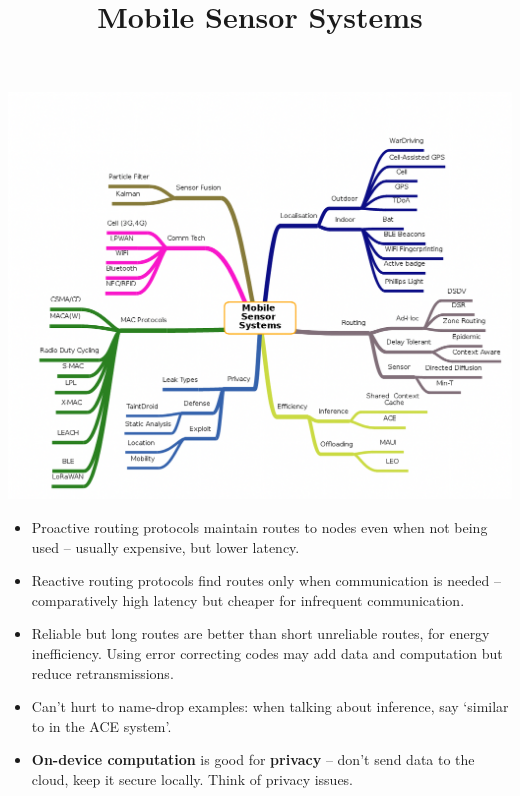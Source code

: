 \documentclass[a4paper, 11pt]{article}
\title{\vspace{-2cm}Mobile Sensor Systems\vspace{-1.5cm}}
\author{}
\date{}
\begin{document}
\maketitle

\includegraphics[angle=-90,width=\textwidth]{mindmap.png}
\newpage

\begin{itemize}
\item Proactive routing protocols maintain routes to nodes even when not being used -- usually expensive, but lower latency.
\item Reactive routing protocols find routes only when communication is needed -- comparatively high latency but cheaper for infrequent communication.
\item Reliable but long routes are better than short unreliable routes, for energy inefficiency. Using error correcting codes may add data and computation but reduce retransmissions.
\item Can't hurt to name-drop examples: when talking about inference, say `similar to in the ACE system'.
\item \textbf{On-device computation} is good for \textbf{privacy} -- don't send data to the cloud, keep it secure locally. Think of privacy issues.
\end{itemize}
\end{document}
